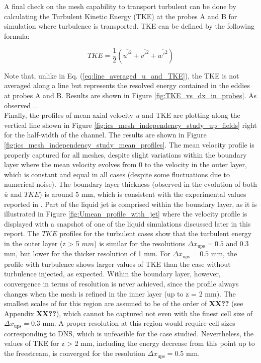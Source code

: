 A final check on the mesh capability to transport turbulent can be done by calculating the Turbulent Kinetic Energy (TKE) at the probes A and B for simulation where turbulence is transported. TKE can be defined by the following formula:

\begin{equation}
TKE = \frac{1}{2} \left( \overline{u'^2} + \overline{v'^2} + \overline{w'^2} \right)
\end{equation}

Note that, unlike in Eq. (\ref{eq:line_averaged_u_and_TKE}), the TKE is not averaged along a line but represents the resolved energy contained in the eddies at probes A and B. 
Results are shown in Figure \ref{fig:TKE_vs_dx_in_probes}. As observed ... \\

Finally, the profiles of mean axial velocity $\overline{u}$ and TKE are plotting along the vertical line shown in Figure \ref{fig:ics_mesh_independency_study_up_fields} right for the half-width of the channel. The results are shown in Figure \ref{fig:ics_mesh_independency_study_mean_profiles}. The mean velocity profile is properly captured for all meshes, despite slight variations within the boundary layer where the mean velocity evolves from 0 to the velocity in the outer layer, which is constant and equal in all cases (despite some fluctuations due to numerical noise). The boundary layer thickness (observed in the evolution of both $\overline{u}$ and $TKE$) is around 5 mm, which is consistent with the experimental values reported in . Part of the liquid jet is comprised within the boundary layer, as it is illustrated in Figure \ref{fig:Umean_profile_with_jet} where the velocity profile is displayed with a snapshot of one of the liquid simulations discussed later in this report. The $TKE$ profiles for the turbulent cases show that the turbulent energy in the outer layer (z > 5 $mm$) is similar for the resolutions $\Delta x_\mathrm{ups} = 0.5$ and $0.3$ mm, but lower for the thicker resolution of 1 mm. For $\Delta x_\mathrm{ups} = 0.5$ mm, the profile with turbulence shows larger values of TKE than the case without turbulence injected, as expected. Within the boundary layer, however, convergence in terms of resolution is never achieved, since the profile always changes when the mesh is refined in the inner layer (up to z = 2 mm). The smallest scales of for this region are assumed to be of the order of \textbf{XX??} (see Appendix \textbf{XX??}), which cannot be captured not even with the finest cell size of $\Delta x_\mathrm{ups} = 0.3$ mm. A proper resolution at this region would require cell sizes corresponding to DNS, which is unfeasible for the case studied. Nevertheless, the values of TKE for z > 2 mm, including the energy decrease from this point up to the freestream, is converged for the resolution $\Delta x_\mathrm{ups} = 0.5$ mm. \\

